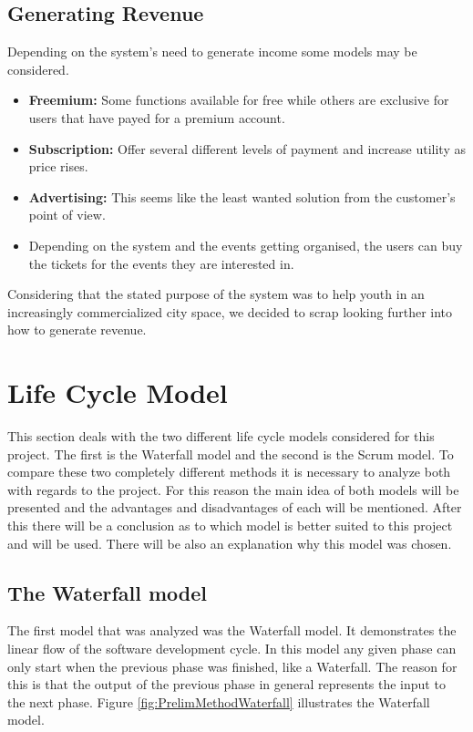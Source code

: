 \subsection{Generating Revenue}
\label{subsec:PrelimMarketRevenue}
Depending on the system's need to generate income some models may be considered.
\begin{itemize}
  \item \textbf{Freemium:} Some functions available for free while others are exclusive for users that have payed for a premium account.
  \item \textbf{Subscription:} Offer several different levels of payment and increase utility as price rises.
  \item \textbf{Advertising:} This seems like the least wanted solution from the customer's point of view.
  \item Depending on the system and the events getting organised, the users can buy the tickets for the events they are interested in.
\end{itemize}

Considering that the stated purpose of the system was to help youth in an increasingly commercialized city space, we decided to scrap looking further into how to generate revenue.

\section{Life Cycle Model}
\label{sec:PrelimMethod}

This section deals with the two different life cycle models considered for this project. The first is the Waterfall model and the second is the Scrum model. To compare these two completely different methods it is necessary to analyze both with regards to the project. For this reason the main idea of both models will be presented and the advantages and disadvantages of each will be mentioned. After this there will be a conclusion as to which model is better suited to this project and will be used. There will be also an explanation why this model was chosen.

\subsection{The Waterfall model}
\label{sec:PrelimMethodWaterfall}
The first model that was analyzed was the Waterfall model. It demonstrates the linear flow of the software development cycle. In this model any given phase can only start when the previous phase was finished, like a Waterfall. The reason for this is that the output of the previous phase in general represents the input to the next phase. Figure \ref{fig:PrelimMethodWaterfall} illustrates the Waterfall model.


